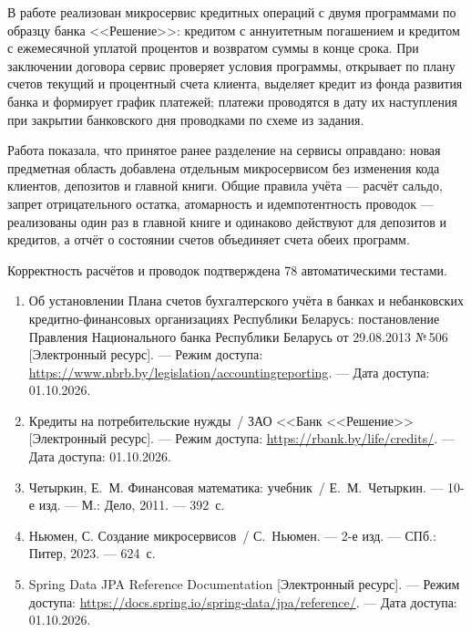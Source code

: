 \documentclass[14pt,a4paper]{extarticle}
\begin{document}


В работе реализован микросервис кредитных операций с двумя программами по образцу банка
<<Решение>>:
кредитом с аннуитетным погашением и кредитом с ежемесячной уплатой процентов и возвратом
суммы в конце срока. При заключении договора сервис проверяет условия программы, открывает
по плану счетов текущий и процентный счета клиента, выделяет кредит из фонда развития банка
и формирует график платежей; платежи проводятся в дату их наступления при закрытии
банковского дня проводками по схеме из задания.

Работа показала, что принятое ранее разделение на сервисы оправдано: новая предметная
область добавлена отдельным микросервисом без изменения кода клиентов, депозитов и главной
книги. Общие правила учёта --- расчёт сальдо, запрет отрицательного остатка, атомарность и
идемпотентность проводок --- реализованы один раз в главной книге и одинаково действуют для
депозитов и кредитов, а отчёт о состоянии счетов объединяет счета обеих программ.

Корректность расчётов и проводок подтверждена 78 автоматическими тестами.


\begin{enumerate}
\item Об установлении Плана счетов бухгалтерского учёта в банках и небанковских
кредитно-финансовых организациях Республики Беларусь: постановление Правления Национального
банка Республики Беларусь от 29.08.2013 №\,506 [Электронный ресурс]. --- Режим доступа:
\url{https://www.nbrb.by/legislation/accountingreporting}. --- Дата доступа: 01.10.2026.
\item Кредиты на потребительские нужды~/ ЗАО <<Банк <<Решение>> [Электронный ресурс]. ---
Режим доступа: \url{https://rbank.by/life/credits/}. --- Дата доступа: 01.10.2026.
\item Четыркин, Е.~М. Финансовая математика: учебник~/ Е.~М.~Четыркин. --- 10-е изд. ---
М.: Дело, 2011. --- 392~с.
\item Ньюмен, С. Создание микросервисов~/ С.~Ньюмен. --- 2-е изд. --- СПб.: Питер, 2023. ---
624~с.
\item Spring Data JPA Reference Documentation [Электронный ресурс]. --- Режим доступа:
\url{https://docs.spring.io/spring-data/jpa/reference/}. --- Дата доступа: 01.10.2026.
\end{enumerate}



\end{document}
